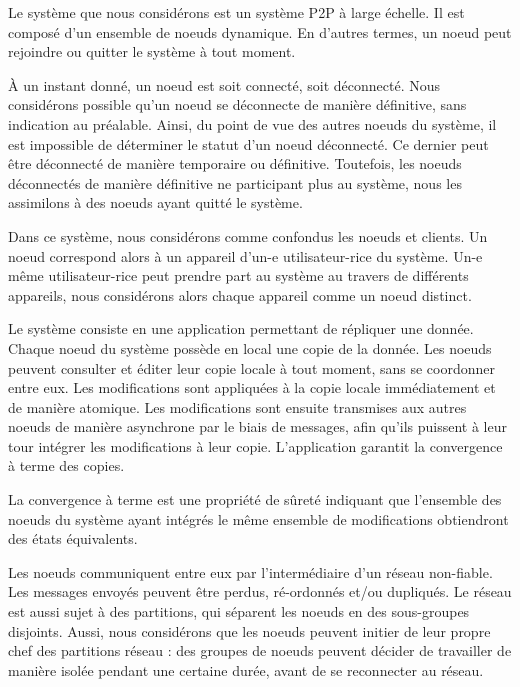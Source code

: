 \label{sec:system-model}

Le système que nous considérons est un système \acf{P2P} à large échelle.
Il est composé d'un ensemble de noeuds dynamique.
En d'autres termes, un noeud peut rejoindre ou quitter le système à tout moment.

À un instant donné, un noeud est soit connecté, soit déconnecté.
Nous considérons possible qu'un noeud se déconnecte de manière définitive, sans indication au préalable.
Ainsi, du point de vue des autres noeuds du système, il est impossible de déterminer le statut d'un noeud déconnecté.
Ce dernier peut être déconnecté de manière temporaire ou définitive.
Toutefois, les noeuds déconnectés de manière définitive ne participant plus au système, nous les assimilons à des noeuds ayant quitté le système.

Dans ce système, nous considérons comme confondus les noeuds et clients.
Un noeud correspond alors à un appareil d'un-e utilisateur-rice du système.
Un-e même utilisateur-rice peut prendre part au système au travers de différents appareils, nous considérons alors chaque appareil comme un noeud distinct.

Le système consiste en une application permettant de répliquer une donnée.
Chaque noeud du système possède en local une copie de la donnée.
Les noeuds peuvent consulter et éditer leur copie locale à tout moment, sans se coordonner entre eux.
Les modifications sont appliquées à la copie locale immédiatement et de manière atomique.
Les modifications sont ensuite transmises aux autres noeuds de manière asynchrone par le biais de messages, afin qu'ils puissent à leur tour intégrer les modifications à leur copie.
L'application garantit la convergence à terme des copies.

\begin{definition}
    La convergence à terme est une propriété de sûreté indiquant que l'ensemble des noeuds du système ayant intégrés le même ensemble de modifications obtiendront des états équivalents\footnotemark.
\end{definition}

Les noeuds communiquent entre eux par l'intermédiaire d'un réseau non-fiable.
Les messages envoyés peuvent être perdus, ré-ordonnés et/ou dupliqués.
Le réseau est aussi sujet à des partitions, qui séparent les noeuds en des sous-groupes disjoints.
Aussi, nous considérons que les noeuds peuvent initier de leur propre chef des partitions réseau : des groupes de noeuds peuvent décider de travailler de manière isolée pendant une certaine durée, avant de se reconnecter au réseau.

